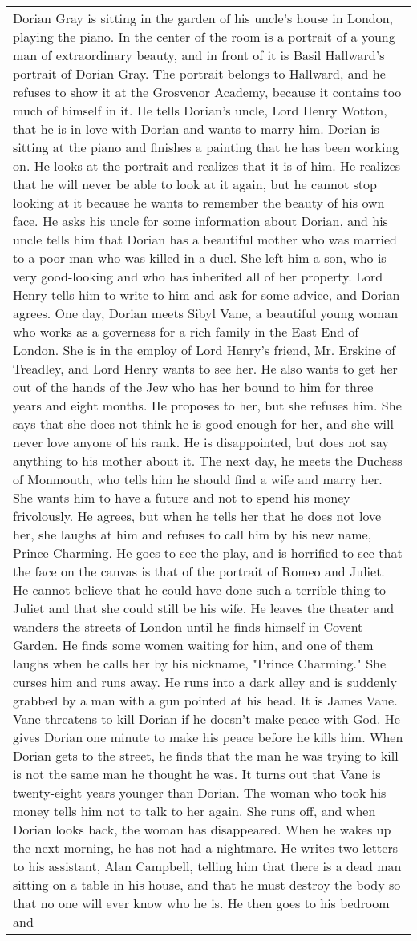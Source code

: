 \documentclass{article} \usepackage{iclr2022_conference,times}
\begin{document}
\begin{table}[!htbp]
\begin{tabular}{p{\linewidth}}
Dorian Gray is sitting in the garden of his uncle's house in London, playing the piano. In the center of the room is a portrait of a young man of extraordinary beauty, and in front of it is Basil Hallward's portrait of Dorian Gray. The portrait belongs to Hallward, and he refuses to show it at the Grosvenor Academy, because it contains too much of himself in it. He tells Dorian's uncle, Lord Henry Wotton, that he is in love with Dorian and wants to marry him. Dorian is sitting at the piano and finishes a painting that he has been working on. He looks at the portrait and realizes that it is of him. He realizes that he will never be able to look at it again, but he cannot stop looking at it because he wants to remember the beauty of his own face. He asks his uncle for some information about Dorian, and his uncle tells him that Dorian has a beautiful mother who was married to a poor man who was killed in a duel. She left him a son, who is very good-looking and who has inherited all of her property. Lord Henry tells him to write to him and ask for some advice, and Dorian agrees. One day, Dorian meets Sibyl Vane, a beautiful young woman who works as a governess for a rich family in the East End of London. She is in the employ of Lord Henry's friend, Mr. Erskine of Treadley, and Lord Henry wants to see her. He also wants to get her out of the hands of the Jew who has her bound to him for three years and eight months. He proposes to her, but she refuses him. She says that she does not think he is good enough for her, and she will never love anyone of his rank. He is disappointed, but does not say anything to his mother about it. The next day, he meets the Duchess of Monmouth, who tells him he should find a wife and marry her. She wants him to have a future and not to spend his money frivolously. He agrees, but when he tells her that he does not love her, she laughs at him and refuses to call him by his new name, Prince Charming. He goes to see the play, and is horrified to see that the face on the canvas is that of the portrait of Romeo and Juliet. He cannot believe that he could have done such a terrible thing to Juliet and that she could still be his wife. He leaves the theater and wanders the streets of London until he finds himself in Covent Garden. He finds some women waiting for him, and one of them laughs when he calls her by his nickname, "Prince Charming." She curses him and runs away. He runs into a dark alley and is suddenly grabbed by a man with a gun pointed at his head. It is James Vane. Vane threatens to kill Dorian if he doesn't make peace with God. He gives Dorian one minute to make his peace before he kills him. When Dorian gets to the street, he finds that the man he was trying to kill is not the same man he thought he was. It turns out that Vane is twenty-eight years younger than Dorian. The woman who took his money tells him not to talk to her again. She runs off, and when Dorian looks back, the woman has disappeared. When he wakes up the next morning, he has not had a nightmare. He writes two letters to his assistant, Alan Campbell, telling him that there is a dead man sitting on a table in his house, and that he must destroy the body so that no one will ever know who he is. He then goes to his bedroom and 
\end{tabular}
\end{table}
\end{document}
